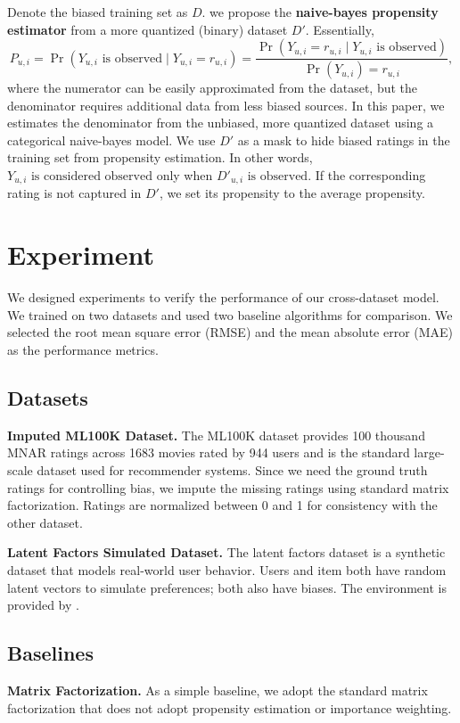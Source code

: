 \documentclass{article}
\begin{document}
Denote the biased training set as $D$. we propose the \textbf{naive-bayes propensity estimator} from a more quantized (binary) dataset $D'$. Essentially,
\begin{equation} 
  P_{u,i} = \Pr(Y_{u,i} \text{ is observed} \mid Y_{u,i} = r_{u,i}) = \frac{\Pr(Y_{u,i} = r_{u,i} \mid Y_{u,i} \text{ is observed})}{\Pr(Y_{u,i}) = r_{u,i}},
\end{equation}
where the numerator can be easily approximated from the dataset, but the denominator requires additional data from less biased sources. In this paper, we estimates the denominator from the unbiased, more quantized dataset using a categorical naive-bayes model. We use $D'$ as a mask to hide biased ratings in the training set from propensity estimation. In other words, $Y_{u,i} \text{ is considered observed}$ only when $D'_{u,i} \text{ is observed}$. If the corresponding rating is not captured in $D'$, we set its propensity to the average propensity. 

\section{Experiment}
We designed experiments to verify the performance of our cross-dataset model. We trained on two datasets and used two baseline algorithms for comparison. We selected the root mean square error (RMSE) and the mean absolute error (MAE) as the performance metrics.

\subsection{Datasets}
\textbf{Imputed ML100K Dataset.}
The ML100K dataset provides 100 thousand MNAR ratings across 1683 movies rated by 944 users and is the standard large-scale dataset used for recommender systems. Since we need the ground truth ratings for controlling bias, we impute the missing ratings using standard matrix factorization. Ratings are normalized between 0 and 1 for consistency with the other dataset. 

\textbf{Latent Factors Simulated Dataset.}
The latent factors dataset is a synthetic dataset that models real-world user behavior. Users and item both have random latent vectors to simulate preferences; both also have biases. The environment is provided by \cite{krauth2020offline}.

\subsection{Baselines}
\textbf{Matrix Factorization.}
As a simple baseline, we adopt the standard matrix factorization that does not adopt propensity estimation or importance weighting.
\end{document}
